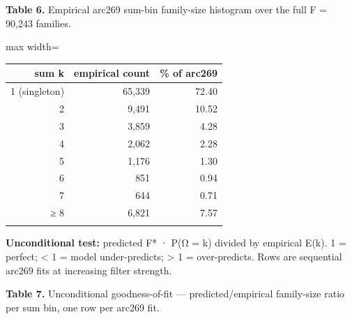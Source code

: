 \documentclass[
  10pt,
]{article}
\begin{document}
\textbf{Table 6.} Empirical arc269 sum-bin family-size histogram over
the full F = 90,243 families.

\begin{center}
\begin{adjustbox}{max width=\textwidth}
\begin{tabular}{@{}rrr@{}}
\toprule\noalign{}
sum k & empirical count & \% of arc269 \\
\midrule\noalign{}
1 (singleton) & 65,339 & 72.40 \\
2 & 9,491 & 10.52 \\
3 & 3,859 & 4.28 \\
4 & 2,062 & 2.28 \\
5 & 1,176 & 1.30 \\
6 & 851 & 0.94 \\
7 & 644 & 0.71 \\
≥ 8 & 6,821 & 7.57 \\
\bottomrule\noalign{}
\end{tabular}
\end{adjustbox}
\end{center}

\textbf{Unconditional test:} predicted F* · P(Ω = k) divided by
empirical E(k). 1 = perfect; \textless{} 1 = model under-predicts;
\textgreater{} 1 = over-predicts. Rows are sequential arc269 fits at
increasing filter strength.

\textbf{Table 7.} Unconditional goodness-of-fit --- predicted/empirical
family-size ratio per sum bin, one row per arc269 fit.
\end{document}
